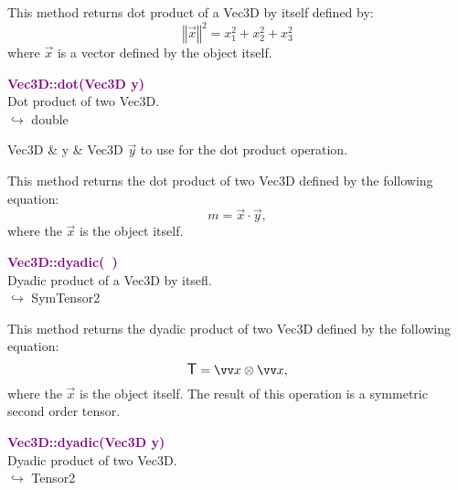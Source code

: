 This method returns dot product of a Vec3D by itself defined by:
\begin{equation*}
\left\Vert \overrightarrow{x} \right\Vert^2  = x_{1}^2 + x_{2}^2 + x_{3}^2
\end{equation*}
where $\overrightarrow{x}$ is a vector defined by the object itself.

\textcolor{purple}{\textbf{Vec3D::dot(Vec3D y)}}\label{Vec3D::dot(Vec3D y)}\\
Dot product of two Vec3D.\\ \hspace*{10mm}$\hookrightarrow$ double

\begin{tcolorbox}[width=\textwidth,myArgs,tabularx={ll|R}]
Vec3D & y & Vec3D $\overrightarrow{y}$ to use for the dot product operation.
\end{tcolorbox}

This method returns the dot product of two Vec3D defined by the following equation:
\begin{equation*}
m = \overrightarrow{x}\cdot\overrightarrow{y},
\end{equation*}
where the $\overrightarrow{x}$ is the object itself.

\textcolor{purple}{\textbf{Vec3D::dyadic(~)}}\label{Vec3D::dyadic()}\\
Dyadic product of a Vec3D by itsefl.\\ \hspace*{10mm}$\hookrightarrow$ SymTensor2

This method returns the dyadic product of two Vec3D defined by the following equation:
\begin{equation*}
\T = \overrightarrow{x}\otimes\overrightarrow{x},
\end{equation*}
where the $\overrightarrow{x}$ is the object itself. The result of this operation is a symmetric second order tensor.

\textcolor{purple}{\textbf{Vec3D::dyadic(Vec3D y)}}\label{Vec3D::dyadic(Vec3D y)}\\
Dyadic product of two Vec3D.\\ \hspace*{10mm}$\hookrightarrow$ Tensor2

